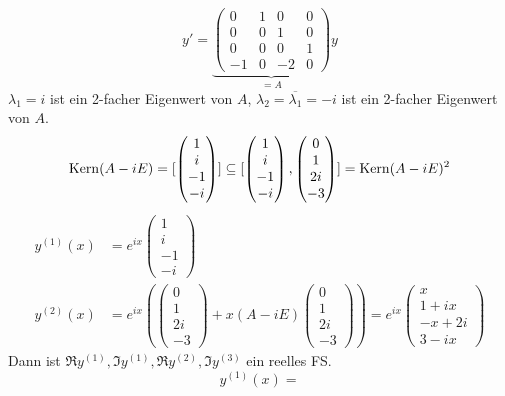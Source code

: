 \documentclass{article}
\begin{document}
\begin{beispiele}
\item
\[ y'  = 
\underbrace{\begin{pmatrix}
0&1&0&0\\
0&0&1&0\\
0&0&0&1\\
-1&0&-2&0
\end{pmatrix}}_{=A} y \]
$\lambda_1=i$ ist ein 2-facher Eigenwert von $A$, $\lambda_2=\overline{\lambda_1}=-i$ ist ein 2-facher Eigenwert von $A$.
\[\mathop{\rm Kern}\nolimits(A-iE) = [
\begin{pmatrix}
1\\i\\-1\\-i
\end{pmatrix}]\subseteq [
\begin{pmatrix}
1\\i\\-1\\-i
\end{pmatrix}, 
\begin{pmatrix}
0\\1\\2i\\-3
\end{pmatrix}
] = \mathop{\rm Kern}\nolimits(A-i E)^2 \]
\begin{align*}
y^{(1)} (x) &= e^{ix}
\begin{pmatrix}
1\\i\\-1\\-i
\end{pmatrix}\\
y^{(2)}(x) &=  e^{ix}\left(
\begin{pmatrix}
0\\1\\2i\\-3
\end{pmatrix} + x(A-iE)
\begin{pmatrix}
0\\1\\2i\\-3
\end{pmatrix}\right) = e^{ix}
\begin{pmatrix}
x\\1+ix\\-x+2i\\3-ix
\end{pmatrix}
\end{align*}
Dann ist $\Re y^{(1)},\Im y^{(1)},\Re y^{(2)},\Im y^{(3)}$ ein reelles FS.
\[ y^{(1)}(x) =
\]
\end{beispiele}
\end{document}
